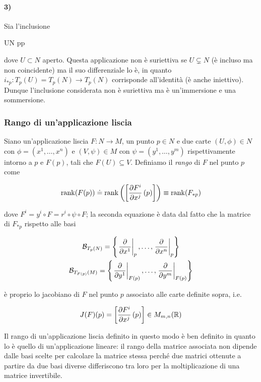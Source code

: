 \paragraph{3)}

Sia l'inclusione

	{U}{N}
	{p}{p}

dove $ U \subset N $ aperto. Questa applicazione non è suriettiva se $ U \subsetneq N $ (è incluso ma non coincidente) ma il suo differenziale lo è, in quanto $ i_{*p} : T_{p}(U) = T_{p}(N) \to T_{p}(N) $ corrisponde all'identità (è anche iniettivo).\\
Dunque l'inclusione considerata non è suriettiva ma è un'immersione e una sommersione.

\subsubsection{Rango di un'applicazione liscia}

Siano un'applicazione liscia $ F : N \to M $, un punto $ p \in N $ e due carte $ (U,\phi) \in N $ con $ \phi = (x^{1},\dots,x^{n}) $ e $ (V,\psi) \in M $ con $ \psi = (y^{1},\dots,y^{m}) $ rispettivamente intorno a $ p $ e $ F(p) $, tali che $ F(U) \subseteq V $. Definiamo il \textit{rango} di $ F $ nel punto $ p $ come

\begin{equation}
	\rank(F(p)) \doteq \rank\left( \left[ \pdv{F^{i}}{x^{j}} \, (p) \right] \right) %
	\equiv \rank(F_{*p})
\end{equation}

dove $ F^{i} = y^{i} \circ F = r^{i} \circ \psi \circ F $; la seconda equazione è data dal fatto che la matrice di $ F_{*p} $ rispetto alle basi

\begin{gather}
	\mathcal{B}_{T_{p}(N)} = \left\{ \eval{ \pdv{x^{1}} }_{p}, \dots, \eval{ \pdv{x^{n}} }_{p} \right\}\\
	\mathcal{B}_{T_{F(p)}(M)} = \left\{ \eval{ \pdv{y^{1}} }_{F(p)}, \dots, \eval{ \pdv{y^{m}} }_{F(p)} \right\}
\end{gather}

è proprio lo jacobiano di $ F $ nel punto $ p $ associato alle carte definite sopra, i.e.

\begin{equation}
	J(F)(p) = \left[ \pdv{F^{i}}{x^{j}} \, (p) \right] \in M_{m,n}(\mathbb{R})
\end{equation}

Il rango di un'applicazione liscia definito in questo modo è ben definito in quanto lo è quello di un'applicazione lineare: il rango della matrice associata non dipende dalle basi scelte per calcolare la matrice stessa perché due matrici ottenute a partire da due basi diverse differiscono tra loro per la moltiplicazione di una matrice invertibile.

